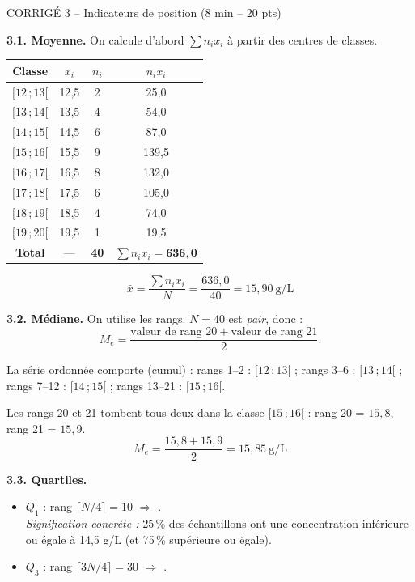 \documentclass[11pt,a4paper]{article}
\begin{document}
\begin{epreuve}{CORRIGÉ 3 -- Indicateurs de position \hfill \small (8 min -- 20 pts)}

\vspace{0.2cm}
\textbf{3.1. Moyenne.} On calcule d'abord $\sum n_i x_i$ à partir des centres de classes.

\begin{center}
\small
\renewcommand{\arraystretch}{1.35}
\begin{tabular}{|c|c|c|c|}
\hline
\rowcolor{corrige!15}
\textbf{Classe} & $x_i$ & $n_i$ & $n_i x_i$ \\
\hline
$[12\,;13[$ & 12{,}5 & 2 & 25{,}0 \\
\hline
$[13\,;14[$ & 13{,}5 & 4 & 54{,}0 \\
\hline
$[14\,;15[$ & 14{,}5 & 6 & 87{,}0 \\
\hline
$[15\,;16[$ & 15{,}5 & 9 & 139{,}5 \\
\hline
$[16\,;17[$ & 16{,}5 & 8 & 132{,}0 \\
\hline
$[17\,;18[$ & 17{,}5 & 6 & 105{,}0 \\
\hline
$[18\,;19[$ & 18{,}5 & 4 & 74{,}0 \\
\hline
$[19\,;20[$ & 19{,}5 & 1 & 19{,}5 \\
\hline
\rowcolor{corrige!15}
\textbf{Total} & --- & \textbf{40} & $\sum n_i x_i = \mathbf{636{,}0}$ \\
\hline
\end{tabular}
\end{center}

$$\boxed{\bar{x} = \frac{\sum n_i x_i}{N} = \frac{636{,}0}{40} = 15{,}90\ \text{g/L}}$$

\vspace{0.3cm}
\textbf{3.2. Médiane.} On utilise les rangs. $N = 40$ est \emph{pair}, donc :
$$M_e = \frac{\text{valeur de rang } 20 + \text{valeur de rang } 21}{2}.$$

La série ordonnée comporte (cumul) : rangs 1--2 : $[12\,;13[$ ; rangs 3--6 : $[13\,;14[$ ; rangs 7--12 : $[14\,;15[$ ; rangs 13--21 : $[15\,;16[$.

Les rangs 20 et 21 tombent tous deux dans la classe $[15\,;16[$ : rang 20 = $15{,}8$, rang 21 = $15{,}9$.
$$\boxed{M_e = \frac{15{,}8+15{,}9}{2} = 15{,}85\ \text{g/L}}$$

\vspace{0.3cm}
\textbf{3.3. Quartiles.}
\begin{itemize}[leftmargin=*,itemsep=1pt]
  \item $Q_1$ : rang $\lceil N/4 \rceil = 10$ $\Rightarrow$ . \\
  \emph{Signification concrète :} 25\,\% des échantillons ont une concentration inférieure ou égale à 14{,}5 g/L (et 75\,\% supérieure ou égale).
  \item $Q_3$ : rang $\lceil 3N/4 \rceil = 30$ $\Rightarrow$ .
\end{itemize}


\end{epreuve}
\end{document}
